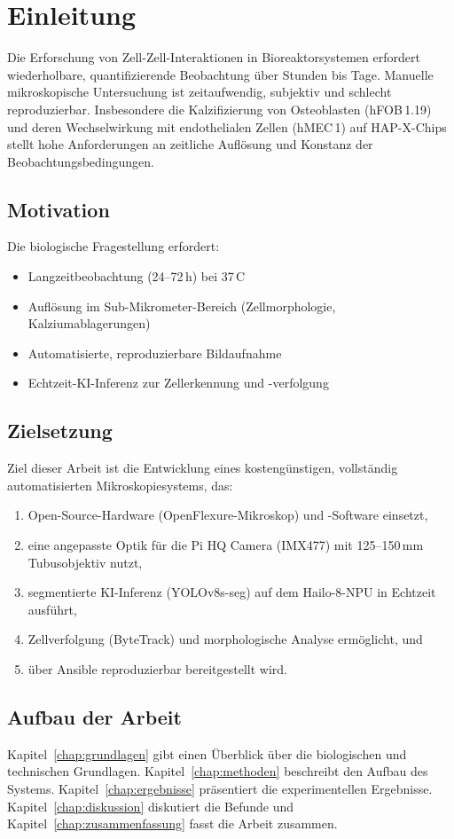 \chapter{Einleitung}

Die Erforschung von Zell-Zell-Interaktionen in Bioreaktorsystemen erfordert
wiederholbare, quantifizierende Beobachtung über Stunden bis Tage. Manuelle
mikroskopische Untersuchung ist zeitaufwendig, subjektiv und schlecht
reproduzierbar. Insbesondere die Kalzifizierung von Osteoblasten
(hFOB\,1.19) und deren Wechselwirkung mit endothelialen Zellen (hMEC\,1)
auf HAP-X-Chips stellt hohe Anforderungen an zeitliche Auflösung und
Konstanz der Beobachtungsbedingungen.

\section{Motivation}

Die biologische Fragestellung erfordert:
\begin{itemize}
    \item Langzeitbeobachtung (24--72\,h) bei 37\,\textdegree C
    \item Auflösung im Sub-Mikrometer-Bereich (Zellmorphologie, Kalziumablagerungen)
    \item Automatisierte, reproduzierbare Bildaufnahme
    \item Echtzeit-KI-Inferenz zur Zellerkennung und -verfolgung
\end{itemize}

\section{Zielsetzung}

Ziel dieser Arbeit ist die Entwicklung eines kostengünstigen, vollständig
automatisierten Mikroskopiesystems, das:
\begin{enumerate}
    \item Open-Source-Hardware (OpenFlexure-Mikroskop) und -Software einsetzt,
    \item eine angepasste Optik für die Pi HQ Camera (IMX477) mit 125--150\,mm
          Tubusobjektiv nutzt,
    \item segmentierte KI-Inferenz (YOLOv8s-seg) auf dem Hailo-8-NPU in Echtzeit
          ausführt,
    \item Zellverfolgung (ByteTrack) und morphologische Analyse ermöglicht, und
    \item über Ansible reproduzierbar bereitgestellt wird.
\end{enumerate}

\section{Aufbau der Arbeit}

Kapitel~\ref{chap:grundlagen} gibt einen Überblick über die biologischen und
technischen Grundlagen. Kapitel~\ref{chap:methoden} beschreibt den Aufbau des
Systems. Kapitel~\ref{chap:ergebnisse} präsentiert die experimentellen
Ergebnisse. Kapitel~\ref{chap:diskussion} diskutiert die Befunde und
Kapitel~\ref{chap:zusammenfassung} fasst die Arbeit zusammen.